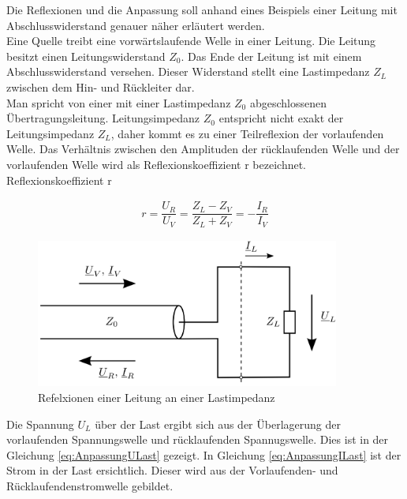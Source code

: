 Die Reflexionen und die Anpassung soll anhand eines Beispiels einer Leitung mit Abschlusswiderstand genauer näher erläutert werden. \\

Eine Quelle treibt eine vorwärtslaufende Welle in einer Leitung. Die Leitung besitzt einen Leitungswiderstand $Z_0$.  Das Ende der Leitung ist mit einem Abschlusswiderstand versehen. Dieser Widerstand stellt eine Lastimpedanz $Z_L$ zwischen dem Hin- und Rückleiter dar. \\
Man spricht von einer mit einer Lastimpedanz $Z_0$ abgeschlossenen Übertragungsleitung. Leitungsimpedanz $Z_0$ entspricht nicht exakt der Leitungsimpedanz $Z_L$, daher kommt es zu einer   Teilreflexion der vorlaufenden Welle. Das Verhältnis zwischen den Amplituden der rücklaufenden Welle und der vorlaufenden Welle wird als Reflexionskoeffizient r bezeichnet. \\

Reflexionskoeffizient r

\begin{eqnarray}\label{eq:Reflexionskoeffizient}
r=\dfrac{U_{R}}{U_{V}}=\dfrac{Z_{L}-Z_{V}}{Z_{L} + Z_{V}}=-\dfrac{I_{R}}{I_{V}}
\end{eqnarray}

\begin{figure}[!h]
	\centering
	\includegraphics[width=10cm]{content/bilder/ReflexionenLeitungLastimpedanz.pdf}%
	\caption{Refelxionen einer Leitung an einer Lastimpedanz \cite{Tekom}}
	\label{FitzDipol}
\end{figure}


Die Spannung $U_L$ über der Last ergibt sich  aus der Überlagerung der vorlaufenden Spannungswelle und  rücklaufenden Spannugswelle. Dies ist in der Gleichung \ref{eq:AnpassungULast} gezeigt. In Gleichung \ref{eq:AnpassungILast} ist der Strom in der Last ersichtlich. Dieser wird aus der Vorlaufenden- und Rücklaufendenstromwelle gebildet.

